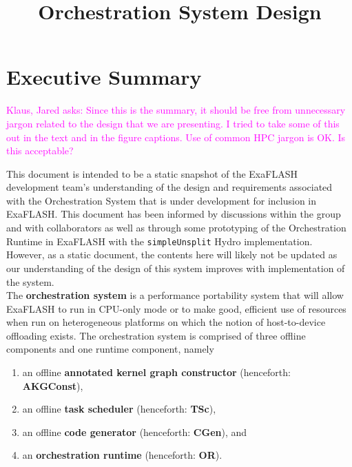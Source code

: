 \documentclass{article}
\title{\FlashOfTheFuture Orchestration System Design}
\newcommand{\FlashOfTheFuture}{ExaFLASH\xspace}
\newcommand{\KlausQfromJO}[1]   {\textcolor{magenta}{Klaus, Jared asks: #1}}
\newcommand{\spelledoutKGC}  {annotated kernel graph constructor\xspace}
\newcommand{\shortKGC}  {AKGConst\xspace}     %
\newcommand{\shortTS}   {TSc\xspace}      %
\newcommand{\shortCG}   {CGen\xspace}     %
\newcommand{\shortOR}   {OR\xspace}
\begin{document}
\lstset{language=[08]Fortran,frame=single,numbers=left,numberstyle=\scriptsize,basicstyle=\small,
captionpos=b}

\theoremstyle{definition} %
\newtheorem{req}{Req}[section]
\newtheorem{spec}{Spec}[section]

\maketitle

\tableofcontents

\section{Executive Summary}
\KlausQfromJO{Since this is the summary, it should be free from unnecessary jargon
related to the design that we are presenting.  I
tried to take some of this out in the text and in the figure captions.  Use of
common HPC jargon is OK.  Is this acceptable?}

This document is intended to be a static snapshot of the \FlashOfTheFuture development
team's understanding of the design and requirements associated with the
Orchestration System that is under development for inclusion in \FlashOfTheFuture.  This
document has been informed by discussions within the group and with
collaborators as well as through some prototyping of the Orchestration Runtime
in \FlashOfTheFuture with the \texttt{simpleUnsplit} Hydro implementation.  However, as a
static document, the contents here will likely not be updated as our
understanding of the design of this system improves with implementation of the
system.\\

The \textbf{orchestration system} is a performance portability system that will
allow \FlashOfTheFuture to run in CPU-only mode or to make good, efficient use of resources
when run on heterogeneous platforms on which the notion of host-to-device
offloading exists. The orchestration system is comprised of
three offline components and one runtime component, namely
\begin{enumerate}
\item{an offline \textbf{\spelledoutKGC} (henceforth: \textbf{\shortKGC}),}
\item{an offline \textbf{task scheduler} (henceforth: \textbf{\shortTS}),}
\item{an offline \textbf{code generator} (henceforth: \textbf{\shortCG}), and}
\item{an \textbf{orchestration runtime} (henceforth: \textbf{\shortOR}).}
\end{enumerate}
\end{document}

